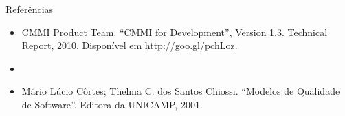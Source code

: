 \begin{frame}{Referências}
  \begin{itemize}
  \item CMMI Product Team. ``CMMI for Development'', Version
    1.3. Technical Report, 2010. Disponível em
    \hbox{\footnotesize\url{http://goo.gl/pchLoz}}.
  \item \ianref{}
  \item Mário Lúcio Côrtes; Thelma C. dos Santos Chiossi. ``Modelos de
    Qualidade de Software''. Editora da UNICAMP, 2001.
  \end{itemize}
\end{frame}